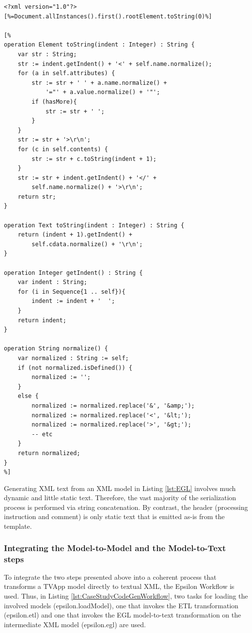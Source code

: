 \begin{lstlisting}[basicstyle=\ttfamily\footnotesize, nolol=true, flexiblecolumns=true, caption=EGL template that generates XML text from XML models, tabsize=2, label=lst:EGL, language=EOL]
<?xml version="1.0"?>
[%=Document.allInstances().first().rootElement.toString(0)%]

[%
operation Element toString(indent : Integer) : String {
	var str : String;
	str := indent.getIndent() + '<' + self.name.normalize();
	for (a in self.attributes) {
		str := str + ' ' + a.name.normalize() + 
			'="' + a.value.normalize() + '"';
		if (hasMore){
			str := str + ' ';
		}
	}
	str := str + '>\r\n';
	for (c in self.contents) {
		str := str + c.toString(indent + 1);
	}
	str := str + indent.getIndent() + '</' + 
		self.name.normalize() + '>\r\n';
	return str;
}

operation Text toString(indent : Integer) : String {
	return (indent + 1).getIndent() + 
		self.cdata.normalize() + '\r\n';
}

operation Integer getIndent() : String {
	var indent : String;
	for (i in Sequence{1 .. self}){
		indent := indent + '  ';
	}
	return indent;
}

operation String normalize() {
	var normalized : String := self;
	if (not normalized.isDefined()) { 
		normalized := '';
	}
	else {
		normalized := normalized.replace('&', '&amp;');
		normalized := normalized.replace('<', '&lt;');
		normalized := normalized.replace('>', '&gt;');
		-- etc
	}
	return normalized;
}
%]
\end{lstlisting}

Generating XML text from an XML model in Listing \ref{lst:EGL} involves much dynamic and little static text. Therefore, the vast majority of the serialization process is performed via string concatenation. By contrast, the header (processing instruction and comment) is only static text that is emitted as-is from the template.

\subsubsection{Integrating the Model-to-Model and the Model-to-Text steps}

To integrate the two steps presented above into a coherent process that transforms a TVApp model directly to textual XML, the Epsilon Workflow is used. Thus, in Listing \ref{lst:CaseStudyCodeGenWorkflow}, two tasks for loading the involved models (epsilon.loadModel), one that invokes the ETL transformation (epsilon.etl) and one that invokes the EGL model-to-text transformation on the intermediate XML model (epsilon.egl) are used.

